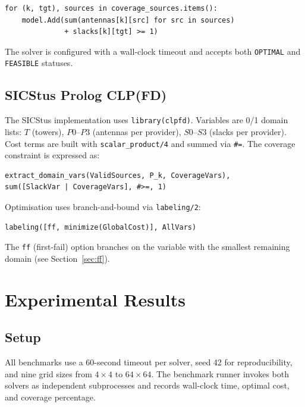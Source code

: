 \documentclass{llncs}
\begin{document}
\begin{lstlisting}[style=python]
for (k, tgt), sources in coverage_sources.items():
    model.Add(sum(antennas[k][src] for src in sources)
              + slacks[k][tgt] >= 1)
\end{lstlisting}

The solver is configured with a wall-clock timeout and accepts both
\texttt{OPTIMAL} and \texttt{FEASIBLE} statuses.

\subsection{SICStus Prolog CLP(FD)}

The SICStus implementation uses \texttt{library(clpfd)}.
Variables are 0/1 domain lists: $T$ (towers), $P0$--$P3$ (antennas per
provider), $S0$--$S3$ (slacks per provider). Cost terms are built with
\texttt{scalar\_product/4} and summed via \texttt{\#=}. The coverage
constraint is expressed as:

\begin{lstlisting}[style=prolog]
extract_domain_vars(ValidSources, P_k, CoverageVars),
sum([SlackVar | CoverageVars], #>=, 1)
\end{lstlisting}

Optimisation uses branch-and-bound via \texttt{labeling/2}:

\begin{lstlisting}[style=prolog]
labeling([ff, minimize(GlobalCost)], AllVars)
\end{lstlisting}

The \texttt{ff} (first-fail) option branches on the variable with the smallest
remaining domain (see Section~\ref{sec:ff}).

\section{Experimental Results}
\label{sec:results}

\subsection{Setup}

All benchmarks use a 60-second timeout per solver, seed 42 for
reproducibility, and nine grid sizes from $4{\times}4$ to $64{\times}64$.
The benchmark runner invokes both solvers as independent subprocesses and
records wall-clock time, optimal cost, and coverage percentage.
\end{document}
